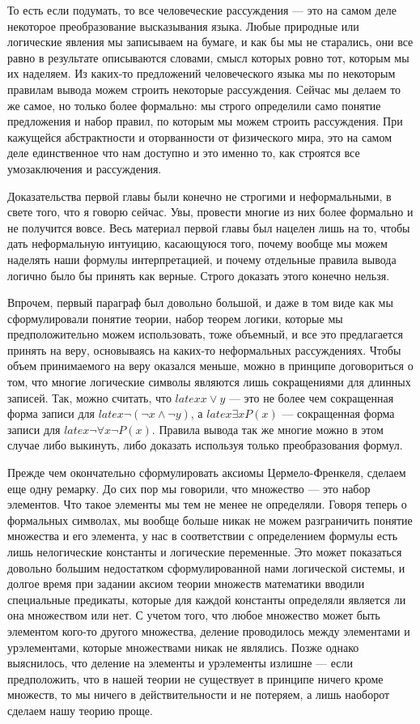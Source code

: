 То есть если подумать, то все человеческие рассуждения — это на самом деле некоторое преобразование высказывания языка. Любые природные или логические явления мы записываем на бумаге, и как бы мы не старались, они все равно в результате описываются словами, смысл которых ровно тот, которым мы их наделяем. Из каких-то предложений человеческого языка мы по некоторым правилам вывода можем строить некоторые рассуждения. Сейчас мы делаем то же самое, но только более формально: мы строго определили само понятие предложения и набор правил, по которым мы можем строить рассуждения. При кажущейся абстрактности и оторванности от физического мира, это на самом деле единственное что нам доступно и это именно то, как строятся все умозаключения и рассуждения.

Доказательства первой главы были конечно не строгими и неформальными, в свете того, что я говорю сейчас. Увы, провести многие из них более формально и не получится вовсе. Весь материал первой главы был нацелен лишь на то, чтобы дать неформальную интуицию, касающуюся того, почему вообще мы можем наделять наши формулы интерпретацией, и почему отдельные правила вывода логично было бы принять как верные. Строго доказать этого конечно нельзя.

Впрочем, первый параграф был довольно большой, и даже в том виде как мы сформулировали понятие теории, набор теорем логики, которые мы предположительно можем использовать, тоже объемный, и все это предлагается принять на веру, основываясь на каких-то неформальных рассуждениях. Чтобы объем принимаемого на веру оказался меньше, можно в принципе договориться о том, что многие логические символы являются лишь сокращениями для длинных записей. Так, можно считать, что $latex x\vee y$ — это не более чем сокращенная форма записи для $latex \neg (\neg x \wedge \neg y)$, а $latex \exists x P(x)$ — сокращенная форма записи для $latex \neg \forall x \neg P(x)$. Правила вывода так же многие можно в этом случае либо выкинуть, либо доказать используя только преобразования формул.

Прежде чем окончательно сформулировать аксиомы Цермело-Френкеля, сделаем еще одну ремарку. До сих пор мы говорили, что множество — это набор элементов. Что такое элементы мы тем не менее не определяли. Говоря теперь о формальных символах, мы вообще больше никак не можем разграничить понятие множества и его элемента, у нас в соответствии с определением формулы есть лишь нелогические константы и логические переменные. Это может показаться довольно большим недостатком сформулированной нами логической системы, и долгое время при задании аксиом теории множеств математики вводили специальные предикаты, которые для каждой константы определяли является ли она множеством или нет. С учетом того, что любое множество может быть элементом кого-то другого множества, деление проводилось между элементами и урэлементами, которые множествами никак не являлись. Позже однако выяснилось, что деление на элементы и урэлементы излишне — если предположить, что в нашей теории не существует в принципе ничего кроме множеств, то мы ничего в действительности и не потеряем, а лишь наоборот сделаем нашу теорию проще.


